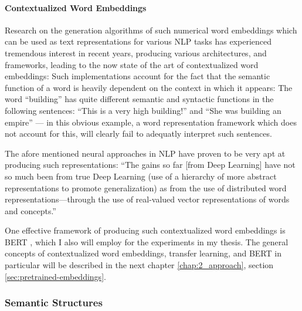 \paragraph*{Contextualized Word Embeddings}

Research on the generation algorithms of such numerical word embeddings which can
be used as text representations for various NLP tasks has experienced tremendous
interest in recent years, producing various architectures, and frameworks, leading
to the now state of the art of contextualized word embeddings: Such implementations
account for the fact that the semantic function of a word is heavily dependent on
the context in which it appears: The word ``building'' has quite different semantic
and syntactic functions in the following sentences: ``This is a very high building!''
and ``She was building an empire'' --- in this obvious example, a word representation
framework which does not account for this, will clearly fail to adequatly interpret
such sentences.

The afore mentioned neural approaches in NLP have proven to be very apt at
producing such representations: ``The gains so far [from Deep Learning] have
not so much been from true Deep Learning (use of a hierarchy of more abstract
representations to promote generalization) as from the use of distributed word
representations—through the use of real-valued vector representations of words
and concepts.'' \citep[p.~703]{manning2015computational}


One effective framework of producing such contextualized word embeddings is BERT \citep{devlin2018bert},
which I also will employ for the experiments in my thesis. The general concepts of contextualized
word embeddings, transfer learning, and BERT in particular will be described in the next chapter
\ref{chap:2_approach}, section \ref{sec:pretrained-embeddings}.


\subsubsection*{Semantic Structures}

